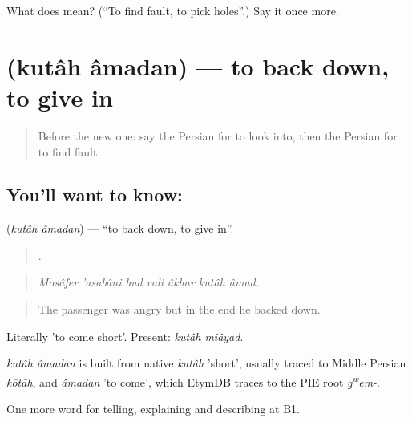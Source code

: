 \begin{tcolorbox}[breakable,colback=teal!4,colframe=teal!35!black,title={Before you move on}]
What does   mean? (\textquotedblleft{}To find fault, to pick holes\textquotedblright{}.) Say it once more.
\end{tcolorbox}
\section[\texorpdfstring{\fa{کوتاه} \fa{آمدن} (kutâh âmadan)}{کوتاه آمدن (kutâh âmadan)}]{  (kutâh âmadan) — to back down, to give in}

\label{lesson:FA-C441-kutah-amadan}



\begin{quote}
Before the new one: say the Persian for to look into, then the Persian for to find fault.
\end{quote}

\subsection*{You'll want to know:  }
\textbf{ } (\emph{kutâh âmadan}) — \textquotedblleft{}to back down, to give in\textquotedblright{}.

\begin{quote}
      .
\end{quote}

\begin{quote}
\emph{Mosâfer 'asabâni bud vali âkhar kutâh âmad.}
\end{quote}

\begin{quote}
The passenger was angry but in the end he backed down.
\end{quote}

Literally 'to come short'. Present: \emph{kutâh miâyad}.

\begin{cousinweb}
\emph{kutâh âmadan} is built from native \emph{kutâh} 'short', usually traced to Middle Persian \emph{kōtāh}, and \emph{âmadan} 'to come', which EtymDB traces to the PIE root \emph{g\textsuperscript{w}em-}.
\end{cousinweb}

\begin{grammarlens}[title={What you've built}]
One more word for telling, explaining and describing at B1.
\end{grammarlens}


